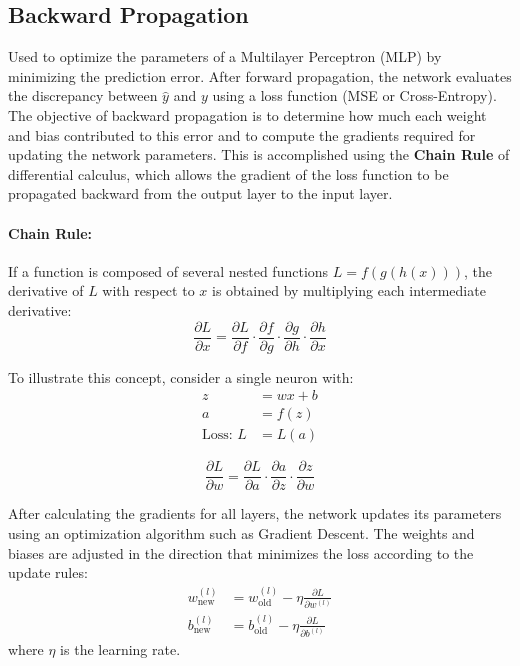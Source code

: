 \subsection{Backward Propagation}

Used to optimize the parameters of a Multilayer Perceptron (MLP) by minimizing the prediction error. After forward propagation, the network evaluates the discrepancy between $\hat{y}$ and $y$ using a loss function (MSE or Cross-Entropy). The objective of backward propagation is to determine how much each weight and bias contributed to this error and to compute the gradients required for updating the network parameters. This is accomplished using the \textbf{Chain Rule} of differential calculus, which allows the gradient of the loss function to be propagated backward from the output layer to the input layer.

\paragraph{Chain Rule:} If a function is composed of several nested functions $L = f(g(h(x)))$, the derivative of $L$ with respect to $x$ is obtained by multiplying each intermediate derivative:
\begin{equation}
\frac{\partial L}{\partial x} = \frac{\partial L}{\partial f} \cdot \frac{\partial f}{\partial g} \cdot \frac{\partial g}{\partial h} \cdot \frac{\partial h}{\partial x}
\end{equation}

To illustrate this concept, consider a single neuron with:
\begin{align}
z &= w x + b \\
a &= f(z) \\
\text{Loss: } L &= L(a)
\end{align}

\begin{equation}
\frac{\partial L}{\partial w} = \frac{\partial L}{\partial a} \cdot \frac{\partial a}{\partial z} \cdot \frac{\partial z}{\partial w}
\end{equation}

After calculating the gradients for all layers, the network updates its parameters using an optimization algorithm such as Gradient Descent. The weights and biases are adjusted in the direction that minimizes the loss according to the update rules:
\begin{align}
w_{\text{new}}^{(l)} &= w_{\text{old}}^{(l)} - \eta \frac{\partial L}{\partial w^{(l)}} \\
b_{\text{new}}^{(l)} &= b_{\text{old}}^{(l)} - \eta \frac{\partial L}{\partial b^{(l)}}
\end{align}
where $\eta$ is the learning rate.

